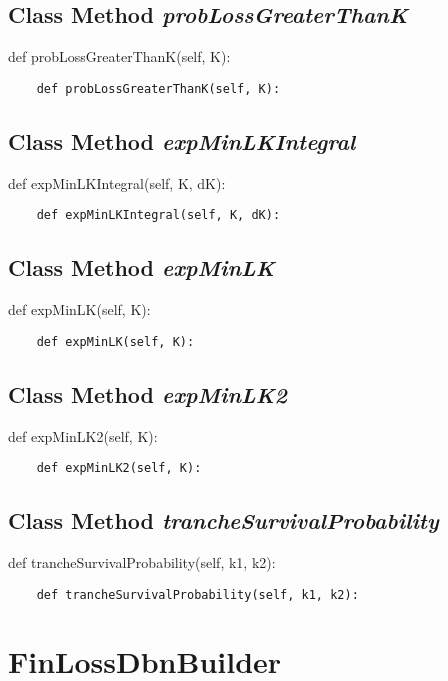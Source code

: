 \documentclass[twoside,11pt]{book}
\begin{document}
\subsection{Class Method {\it probLossGreaterThanK}}
def probLossGreaterThanK(self, K):

\begin{lstlisting}
    def probLossGreaterThanK(self, K):
\end{lstlisting}

\subsection{Class Method {\it expMinLKIntegral}}
def expMinLKIntegral(self, K, dK):

\begin{lstlisting}
    def expMinLKIntegral(self, K, dK):
\end{lstlisting}

\subsection{Class Method {\it expMinLK}}
def expMinLK(self, K):

\begin{lstlisting}
    def expMinLK(self, K):
\end{lstlisting}

\subsection{Class Method {\it expMinLK2}}
def expMinLK2(self, K):

\begin{lstlisting}
    def expMinLK2(self, K):
\end{lstlisting}

\subsection{Class Method {\it trancheSurvivalProbability}}
def trancheSurvivalProbability(self, k1, k2):

\begin{lstlisting}
    def trancheSurvivalProbability(self, k1, k2):
\end{lstlisting}

\newpage
\section{FinLossDbnBuilder}
\end{document}
